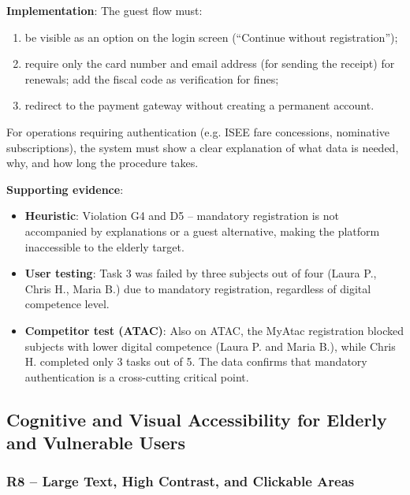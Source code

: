 ﻿\documentclass[11pt,a4paper]{article}
\begin{document}
\textbf{Implementation}: The guest flow must:
\begin{enumerate}
    \item be visible as an option on the login screen
    (``Continue without registration'');
    \item require only the card number and email address (for
    sending the receipt) for renewals; add the fiscal code
    as verification for fines;
    \item redirect to the payment gateway without creating a permanent
    account.
\end{enumerate}
For operations requiring authentication (e.g. ISEE fare
concessions, nominative subscriptions), the system must show
a clear explanation of what data is needed, why, and how long
the procedure takes.

\textbf{Supporting evidence}:
\begin{itemize}
    \item \textbf{Heuristic}: Violation G4 and D5 -- mandatory
    registration is not accompanied by explanations or a guest
    alternative, making the platform inaccessible to the elderly target.
    \item \textbf{User testing}: Task 3 was failed by three
    subjects out of four (Laura P., Chris H., Maria B.) due to
    mandatory registration, regardless of digital competence level.
    \item \textbf{Competitor test (ATAC)}: Also on ATAC, the
    MyAtac registration blocked subjects with lower digital
    competence (Laura P. and Maria B.), while Chris H. completed only
    3 tasks out of 5. The data confirms that mandatory authentication
    is a cross-cutting critical point.
\end{itemize}




\subsection{Cognitive and Visual Accessibility for Elderly and Vulnerable Users}

\subsubsection{R8 -- Large Text, High Contrast, and Clickable Areas}
\label{rec:R8}
\end{document}
